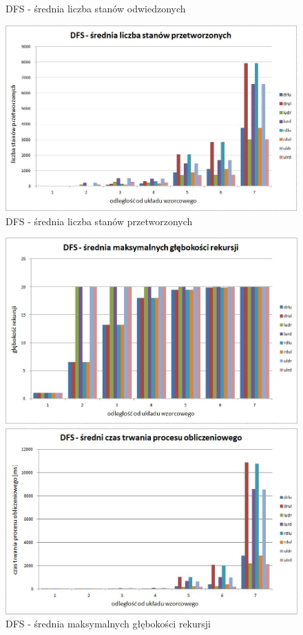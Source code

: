 \documentclass{classrep}
\begin{document}
{\begin{figure}[ht!]
\begin{center}
		\caption{DFS - średnia liczba stanów odwiedzonych}
		\vspace{0.5in}
		\includegraphics[scale=0.6]{dfs3}
		\caption{DFS - średnia liczba stanów przetworzonych}
	\end{center}
\end{figure}
\newpage
\begin{figure}[ht!]
	\begin{center}
		\vspace{0.3in}
		\includegraphics[scale=0.6]{dfs4}
		\caption{DFS - średnia maksymalnych głębokości rekursji}
		\vspace{0.5in}
		\includegraphics[scale=0.6]{dfs5}

\end{center}
\end{figure}}
\end{document}
